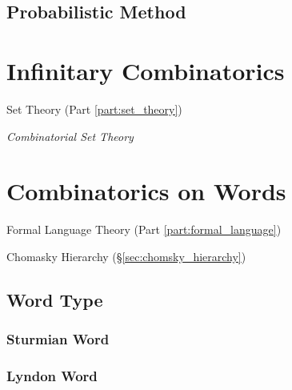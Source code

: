 \subsection{Probabilistic Method}\label{sec:probabilistic_method}



\section{Infinitary Combinatorics}\label{sec:infinitary_combinatorics}

Set Theory (Part \ref{part:set_theory})

\emph{Combinatorial Set Theory}



\section{Combinatorics on Words}\label{sec:combinatorics_on_words}

Formal Language Theory (Part \ref{part:formal_language})

Chomasky Hierarchy (\S\ref{sec:chomsky_hierarchy})



\subsection{Word Type}\label{sec:word_type}

\subsubsection{Sturmian Word}\label{sec:sturmian_word}

\subsubsection{Lyndon Word}\label{sec:lyndon_word}



